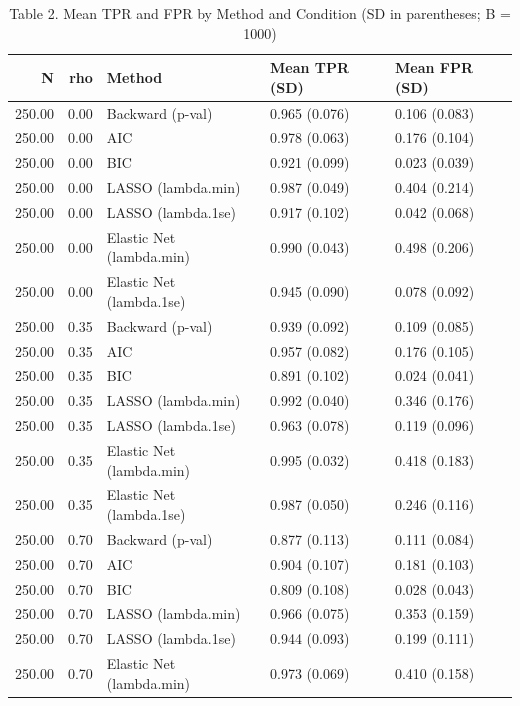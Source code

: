 \begin{table}[ht]
\centering
\caption{Table 2. Mean TPR and FPR by Method and Condition (SD in parentheses; B = 1000)} 
\begin{tabular}{rrlll}
  \toprule
N & rho & Method & Mean TPR (SD) & Mean FPR (SD) \\ 
  \midrule
250.00 & 0.00 & Backward (p-val) & 0.965 (0.076) & 0.106 (0.083) \\ 
  250.00 & 0.00 & AIC & 0.978 (0.063) & 0.176 (0.104) \\ 
  250.00 & 0.00 & BIC & 0.921 (0.099) & 0.023 (0.039) \\ 
  250.00 & 0.00 & LASSO (lambda.min) & 0.987 (0.049) & 0.404 (0.214) \\ 
  250.00 & 0.00 & LASSO (lambda.1se) & 0.917 (0.102) & 0.042 (0.068) \\ 
  250.00 & 0.00 & Elastic Net (lambda.min) & 0.990 (0.043) & 0.498 (0.206) \\ 
  250.00 & 0.00 & Elastic Net (lambda.1se) & 0.945 (0.090) & 0.078 (0.092) \\ 
  250.00 & 0.35 & Backward (p-val) & 0.939 (0.092) & 0.109 (0.085) \\ 
  250.00 & 0.35 & AIC & 0.957 (0.082) & 0.176 (0.105) \\ 
  250.00 & 0.35 & BIC & 0.891 (0.102) & 0.024 (0.041) \\ 
  250.00 & 0.35 & LASSO (lambda.min) & 0.992 (0.040) & 0.346 (0.176) \\ 
  250.00 & 0.35 & LASSO (lambda.1se) & 0.963 (0.078) & 0.119 (0.096) \\ 
  250.00 & 0.35 & Elastic Net (lambda.min) & 0.995 (0.032) & 0.418 (0.183) \\ 
  250.00 & 0.35 & Elastic Net (lambda.1se) & 0.987 (0.050) & 0.246 (0.116) \\ 
  250.00 & 0.70 & Backward (p-val) & 0.877 (0.113) & 0.111 (0.084) \\ 
  250.00 & 0.70 & AIC & 0.904 (0.107) & 0.181 (0.103) \\ 
  250.00 & 0.70 & BIC & 0.809 (0.108) & 0.028 (0.043) \\ 
  250.00 & 0.70 & LASSO (lambda.min) & 0.966 (0.075) & 0.353 (0.159) \\ 
  250.00 & 0.70 & LASSO (lambda.1se) & 0.944 (0.093) & 0.199 (0.111) \\ 
  250.00 & 0.70 & Elastic Net (lambda.min) & 0.973 (0.069) & 0.410 (0.158) \\ 

\end{tabular}
\end{table}
